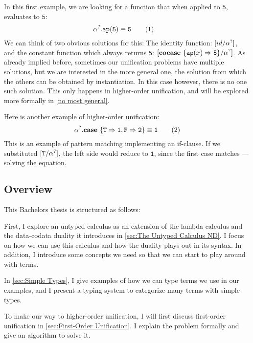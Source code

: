 \documentclass[twoside,12pt,a4paper]{article}
\begin{document}
\begin{example}\label{sec:mgu}
    In this first example, we are looking for a function that when applied to $\mathtt{5}$, evaluates to $\mathtt{5}$:
    \begin{align*}
        &\alpha^?.\texttt{ap}(\mathtt{5}) \equiv \mathtt{5}\tag{1} 
    \end{align*}
    We can think of two obvious solutions for this: The identity function: $[id / \alpha^?]$, and the constant function which always returns \texttt{5}: $[\textbf{cocase}\ \{\texttt{ap}(x)\Rightarrow \mathtt{5}\} / \alpha^?]$.
    As already implied before, sometimes our unification problems have multiple solutions, 
    but we are interested in the more general one, the solution from which the others can be obtained by instantiation.
    In this case however, there is no one such solution. This only happens in higher-order unification, 
    and will be explored more formally in \cref{no most general}.
    
    Here is another example of higher-order unification:
    \begin{align*}
    \alpha^?.\textbf{case}\ \{\mathtt{T \Rightarrow 1, F \Rightarrow 2}\}\equiv \mathtt{1} \tag{2}
    \end{align*}
    This is an example of pattern matching implementing an if-clause.
    If we substituted $[\mathtt{T / \alpha^?}]$, the left side would reduce to $\mathtt{1}$,
    since the first case matches --- solving the equation.
\end{example}

\subsection{Overview}
This Bachelors thesis is structured as follows:

First, I explore an untyped calculus as an extension of the lambda calculus and the data-codata duality it introduces in \cref{sec:The Untyped Calculus ND}.
I focus on how we can use this calculus and how the duality plays out in its syntax.
In addition, I introduce some concepts we need so that we can start to play around with terms.

In \cref{sec:Simple Types}, I give examples of how we can type terms we use in our examples, 
and I present a typing system to categorize many terms with simple types.

To make our way to higher-order unification, I will first discuss first-order unification in \cref{sec:First-Order Unification}.
I explain the problem formally and give an algorithm to solve it.
\end{document}
